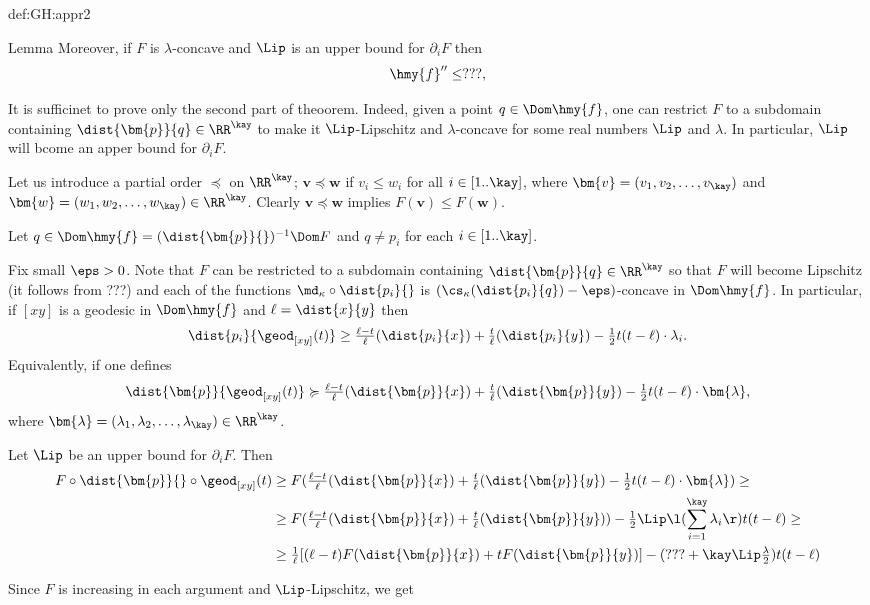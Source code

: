 {\begin{subthm}{def:GH:appr2}
\begin{thm}{Lemma}
Moreover, 
if $F$ is $\lambda$-concave 
and $\Lip$ is an upper bound for $\partial_i F$
then
$$\hmy{f}''\le ???,$$
\end{thm}

It is sufficinet to prove only the 
second part of theoorem. 
Indeed, given a point $q\in \Dom \hmy{f}$, 
one can restrict $F$ to a subdomain containing $\dist{\bm{p}}{q}\in\RR^\kay$ to make it $\Lip$-Lipschitz and $\lambda$-concave for some real numbers $\Lip$ and $\lambda$.
In particular, $\Lip$ will bcome an apper bound for $\partial_iF$.

Let us introduce a partial order $\preccurlyeq$ on $\RR^\kay$; 
$\bm{v}\preccurlyeq\bm{w}$ if $v_i\le w_i$ for all $i\in[1..\kay]$,
where $\bm{v}=(v_1,v_2,\dots,v_\kay)$ and $\bm{w}=(w_1,w_2,\dots,w_\kay)\in\RR^\kay$.
Clearly $\bm{v}\preccurlyeq\bm{w}$ implies $F(\bm{v})\le F(\bm{w})$.

Let $q\in\Dom \hmy{f}=(\dist{\bm{p}}{})^{-1}\Dom F$ and $q\not=p_i$ for each $i\in[1..\kay]$.


Fix small $\eps>0$.
Note that $F$ can be restricted to a subdomain containing $\dist{\bm{p}}{q}\in\RR^\kay$ so that $F$ will become Lipschitz (it follows from ???)
and each of the functions $\md_\kappa\circ\dist{p_i}{}$ is $(\cs_\kappa(\dist{p_i}{q})-\eps)$-concave in $\Dom\hmy{f}$.
In particular, if $[xy]$ is a geodesic in $\Dom\hmy{f}$ and $\ell=\dist{x}{y}$
then
$$\dist{p_i}{\geod_{[xy]}(t)}
\ge 
\tfrac{\ell-t}{\ell}(\dist{p_i}{x})
+
\tfrac{t}{\ell}(\dist{p_i}{y})
-
\tfrac12t(t-\ell)\cdot\lambda_i.$$
Equivalently,
if one defines 
$$\dist{\bm{p}}{\geod_{[xy]}(t)}
\succcurlyeq
\tfrac{\ell-t}{\ell}(\dist{\bm{p}}{x})
+
\tfrac{t}{\ell}(\dist{\bm{p}}{y})
-
\tfrac12t(t-\ell)\cdot\bm{\lambda},$$
where $\bm{\lambda}=(\lambda_1,\lambda_2,\dots,\lambda_\kay)\in\RR^\kay$.

Let $\Lip$ be an upper bound for $\partial_iF$.
Then
\begin{align*}
F\circ\dist{\bm{p}}{}\circ\geod_{[xy]}(t)
&\ge
F(\tfrac{\ell-t}{\ell}(\dist{\bm{p}}{x})
+
\tfrac{t}{\ell}(\dist{\bm{p}}{y})
-
\tfrac12t(t-\ell)\cdot\bm{\lambda})
\ge
\\
&
\ge F(\tfrac{\ell-t}{\ell}(\dist{\bm{p}}{x})
+
\tfrac{t}{\ell}(\dist{\bm{p}}{y}))
-
\tfrac12\Lip\l(\sum_{i=1}^{\kay}\lambda_i\r) t(t-\ell)
\ge
\\
&\ge
\tfrac1\ell[(\ell-t)F(\dist{\bm{p}}{x})
+
tF(\dist{\bm{p}}{y})]
-
(???+\kay\Lip\tfrac\lambda2) t(t-\ell)
\end{align*}


Since $F$ is increasing in each argument and $\Lip$-Lipschitz, we get



\end{subthm}}
